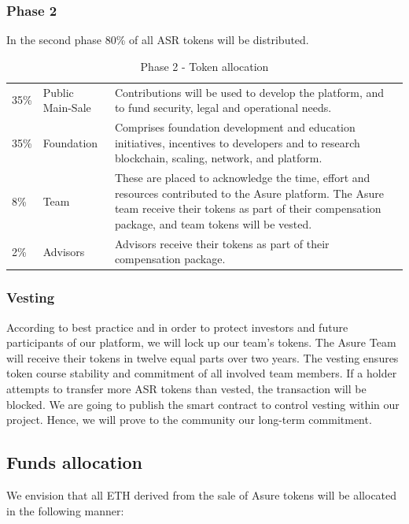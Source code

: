 \subsubsection{Phase 2}

In the second phase 80\% of all ASR tokens will be distributed.

\begin{table}[H]
\begin{tabular}{llp{}l}
  35\% & Public Main-Sale & Contributions will be used to develop the platform, and to fund security, legal and operational needs. \\
  35\% & Foundation & Comprises foundation development and education initiatives, incentives to developers and to research blockchain, scaling, network, and platform.\\
  8\% & Team  & These are placed to acknowledge the time, effort and resources contributed to the Asure platform.  The Asure team receive their tokens as part of their compensation package, and team tokens will be vested.\\
  2\% & Advisors & Advisors receive their tokens as part of their compensation package.
\end{tabular}
\caption{\label{tab:table-name} Phase 2 - Token allocation}
\end{table}

\subsubsection{Vesting}
According to best practice and in order to protect investors and future participants of our platform, we will lock up our team’s tokens. The Asure Team will receive their tokens in twelve equal parts over two years.
The vesting ensures token course stability and commitment of all involved team members. If a holder attempts to transfer more ASR tokens than vested, the transaction will be blocked.
We are going to publish the smart contract to control vesting within our project. Hence, we will prove to the community our long-term commitment. 

\subsection{Funds allocation}

We envision that all ETH derived from the sale of Asure tokens will be allocated in the following manner:
\newline\newline

